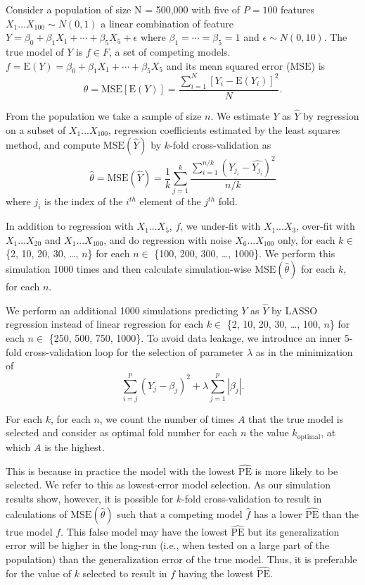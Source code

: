 \documentclass[
  12pt,
]{article}
\begin{document}
Consider a population of size N = 500,000 with five of \(P = 100\)
features \(X_1...X_{100} \sim N(0, 1)\) a linear combination of feature
\(Y = \beta_0 + \beta_1X_1 + \cdots + \beta_5X_5 + \epsilon\) where
\(\beta_1 = \cdots = \beta_5 = 1\) and \(\epsilon \sim N(0, 10)\). The
true model of \(Y\) is \(f \in F\), a set of competing models.
\(f = \mathrm{E}(Y) = \beta_0 + \beta_1X_1 + \cdots + \beta_5X_5\) and
its mean squared error (\(\mathrm{MSE}\)) is
\[\theta = \mathrm{MSE}[\mathrm{E}(Y)] = \frac{\sum_{i=1}^{N}[Y_i - \mathrm{E}(Y_i)]^2}{N}.\]

From the population we take a sample of size \(n\). We estimate \(Y\) as
\(\hat{Y}\) by regression on a subset of \(X_1...X_{100}\), regression
coefficients estimated by the least squares method, and compute
\(\mathrm{MSE}(\hat{Y})\) by \(k\)-fold cross-validation as
\[\hat{\theta} = \mathrm{MSE}(\hat{Y}) = \frac{1}{k}\sum_{j=1}^{k}\frac{\sum_{i=1}^{n/k}(Y_{j_i} - \hat{Y_{j_i}})^2}{n/k}\]
where \(j_i\) is the index of the \(i^{th}\) element of the \(j^{th}\)
fold.

In addition to regression with \(X_1...X_5\), \(f\), we under-fit with
\(X_1...X_3\), over-fit with \(X_1...X_{20}\) and \(X_1...X_{100}\), and
do regression with noise \(X_6...X_{100}\) only, for each \(k \in\) \{2,
10, 20, 30, \ldots, \(n\)\} for each \(n \in\) \{100, 200, 300, \ldots,
1000\}. We perform this simulation 1000 times and then calculate
simulation-wise \(\mathrm{MSE}(\hat{\theta})\) for each \(k\), for each
\(n\).

We perform an additional 1000 simulations predicting \(Y\) as
\(\hat{Y}\) by LASSO regression instead of linear regression for each
\(k \in\) \{2, 10, 20, 30, \ldots, 100, \(n\)\} for each \(n \in\)
\{250, 500, 750, 1000\}. To avoid data leakage, we introduce an inner
5-fold cross-validation loop for the selection of parameter \(\lambda\)
as in the minimization of
\[\sum_{i=j}^{p}(Y_j - \beta_j)^2 + \lambda\sum_{j=1}^{p}|\beta_j|.\]

For each \(k\), for each \(n\), we count the number of times \(A\) that
the true model is selected and consider as optimal fold number for each
\(n\) the value \(k_\mathrm{optimal}\), at which \(A\) is the highest.

This is because in practice the model with the lowest
\(\mathrm{\widehat{PE}}\) is more likely to be selected. We refer to
this as lowest-error model selection. As our simulation results show,
however, it is possible for \(k\)-fold cross-validation to result in
calculations of \(\mathrm{MSE}(\hat{\theta})\) such that a competing
model \(\hat{f}\) has a lower \(\mathrm{\widehat{PE}}\) than the true
model \(f\). This false model may have the lowest
\(\mathrm{\widehat{PE}}\) but its generalization error will be higher in
the long-run (i.e., when tested on a large part of the population) than
the generalization error of the true model. Thus, it is preferable for
the value of \(k\) selected to result in \(f\) having the lowest
\(\mathrm{\widehat{PE}}\).
\end{document}
